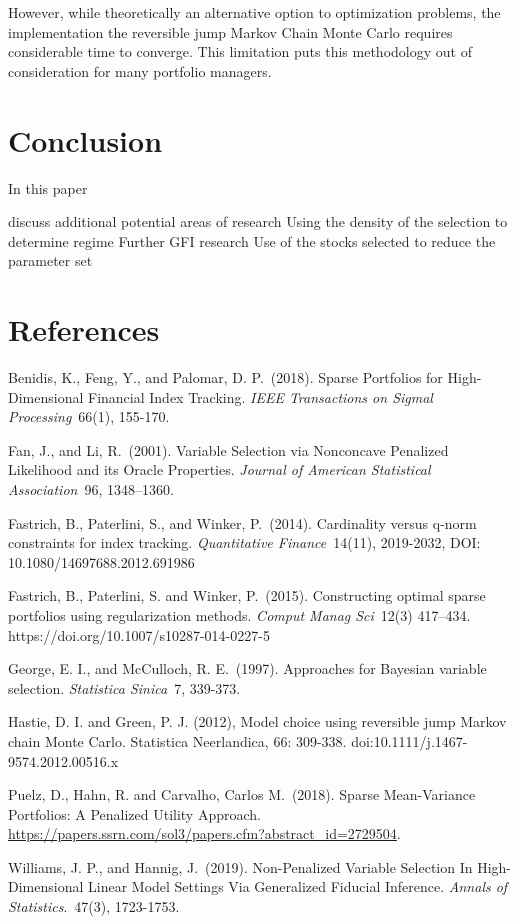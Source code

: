 \documentclass[a4paper, 12pt]{article}
\theoremstyle{plain}
\theoremstyle{definition}
\theoremstyle{remark}
\begin{document}
However, while theoretically an alternative option to optimization problems, the implementation the reversible jump Markov Chain Monte Carlo requires considerable time to converge. This limitation puts this methodology out of consideration for many portfolio managers.

\section{Conclusion}

In this paper 

{\color{red} discuss additional potential areas of research}
Using the density of the selection to determine regime
Further GFI research
Use of the stocks selected to reduce the parameter set

\section*{References}

\begin{description}

\item{} Benidis, K., Feng, Y., and Palomar, D. P.~(2018). Sparse Portfolios for High-Dimensional Financial Index Tracking. \emph{IEEE Transactions on Sigmal Processing}~66(1), 155-170.

\item{} Fan, J., and Li, R.~(2001). Variable Selection via Nonconcave Penalized Likelihood and its
Oracle Properties. \emph{Journal of American Statistical Association}~96, 1348–1360.

\item{} Fastrich, B., Paterlini, S., and Winker, P.~(2014). Cardinality versus q-norm constraints for index tracking. \emph{Quantitative Finance}~14(11), 2019-2032, DOI: 10.1080/14697688.2012.691986

\item{} Fastrich, B., Paterlini, S. and Winker, P.~(2015). Constructing optimal sparse portfolios using regularization methods. \emph{Comput Manag Sci}~12(3) 417–434. https://doi.org/10.1007/s10287-014-0227-5

\item{} George, E. I., and McCulloch, R. E.~(1997). Approaches for Bayesian variable selection. \emph{Statistica Sinica}~7, 339-373.

\item{} Hastie, D. I. and Green, P. J. (2012), Model choice using reversible jump Markov chain Monte Carlo. Statistica Neerlandica, 66: 309-338. doi:10.1111/j.1467-9574.2012.00516.x

\item{} Puelz, D., Hahn, R. and Carvalho, Carlos M.~(2018). Sparse Mean-Variance Portfolios: A Penalized Utility Approach. \url{https://papers.ssrn.com/sol3/papers.cfm?abstract_id=2729504}.

\item{} Williams, J. P., and Hannig, J.~(2019). Non-Penalized Variable Selection In High-Dimensional Linear Model Settings Via Generalized Fiducial Inference. \emph{Annals of Statistics}.~47(3), 1723-1753. 

\end{description}
\end{document}
